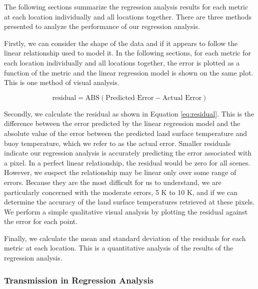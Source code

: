 \documentclass{book}
\begin{document}
The following sections summarize the regression analysis results for each metric at each location individually and all locations together.  There are three methods presented to analyze the performance of our regression analysis.  

Firstly, we can consider the shape of the data and if it appears to follow the linear relationship used to model it.  In the following sections, for each metric for each location individually and all locations together, the error is plotted as a function of the metric and the linear regression model is shown on the same plot.  This is one method of visual analysis.

\begin{equation}
\mbox{residual} = \mbox{ABS}(\mbox{Predicted Error} - \mbox{Actual Error})
\label{eq:residual}
\end{equation}

Secondly, we calculate the residual as shown in Equation \ref{eq:residual}.  This is the difference between the error predicted by the linear regression model and the absolute value of the error between the predicted land surface temperature and buoy temperature, which we refer to as the actual error.  Smaller residuals indicate our regression analysis is accurately predicting the error associated with a pixel.  In a perfect linear relationship, the residual would be zero for all scenes.  However, we suspect the relationship may be linear only over some range of errors.  Because they are the most difficult for us to understand, we are particularly concerned with the moderate errors, 5 K to 10 K, and if we can determine the accuracy of the land surface temperatures retrieved at these pixels.  We perform a simple qualitative visual analysis by plotting the residual against the error for each point.  

Finally, we calculate the mean and standard deviation of the residuals for each metric at each location.  This is a quantitative analysis of the results of the regression analysis.

\subsubsection{Transmission in Regression Analysis}
\end{document}
